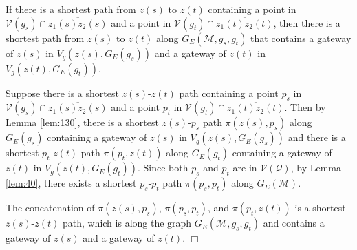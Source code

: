 \documentclass[english,runningheads,11pt]{llncs}
\def\calM{\mathcal{M}}
\def\calQ{\mathcal{Q}}
\def\calV{\mathcal{V}}
\newenvironment{proof}{\noindent {\textbf{Proof:}}\rm}{\hfill $\Box$\rm}
\begin{document}
\begin{lemma}\label{lem:180}
If there is a shortest path from $z(s)$ to $z(t)$ containing a point in $\calV(g_s)\cap
\overline{z_1(s)z_2(s)}$ and a point in $\calV(g_t)\cap \overline{z_1(t)z_2(t)}$,
then there is a shortest path from $z(s)$ to $z(t)$ along $G_E(\calM,g_s,g_t)$ that contains
a gateway of $z(s)$ in $V_g(z(s),G_E(g_s))$ and a gateway of $z(t)$ in
$V_g(z(t),G_E(g_t))$.
\end{lemma}
\begin{proof}
Suppose there is a shortest $z(s)$-$z(t)$ path containing a point $p_s$ in $\calV(g_s)\cap
\overline{z_1(s)z_2(s)}$ and a point $p_t$ in $\calV(g_t)\cap \overline{z_1(t)z_2(t)}$.
Then by Lemma \ref{lem:130}, there is a shortest $z(s)$-$p_s$ path $\pi(z(s),p_s)$ along $G_E(g_s)$
containing a gateway of $z(s)$ in $V_g(z(s),G_E(g_s))$ and there is a shortest $p_t$-$z(t)$
path $\pi(p_t,z(t))$ along $G_E(g_t)$ containing a gateway of $z(t)$ in $V_g(z(t),G_E(g_t))$.
Since both $p_s$ and $p_t$ are in $\calV(\calQ)$, by Lemma \ref{lem:40}, there exists a shortest
$p_s$-$p_t$ path $\pi(p_s,p_t)$ along $G_E(\calM)$.

The concatenation of $\pi(z(s),p_s)$, $\pi(p_s,p_t)$, and $\pi(p_t,z(t))$ is a shortest $z(s)$-$z(t)$ path,
which is along the graph $G_E(\calM,g_s,g_t)$ and contains a gateway of $z(s)$ and a gateway of $z(t)$.
\end{proof}
\end{document}

